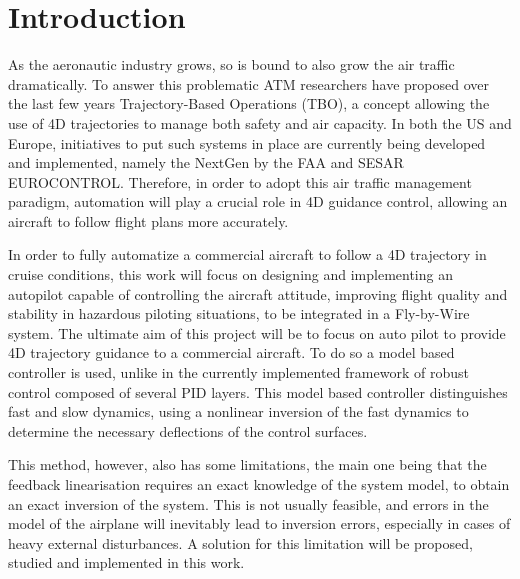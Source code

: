 
\section{Introduction}
\label{sec:intro}

As the aeronautic industry grows, so is bound to also grow the air traffic dramatically. To answer this problematic ATM researchers have proposed over the last few years Trajectory-Based Operations (TBO), a concept allowing the use of 4D trajectories to manage both safety and air capacity. In both the US and Europe, initiatives to put such systems in place are currently being developed and implemented, namely the NextGen by the FAA and SESAR EUROCONTROL. Therefore, in order to adopt this air traffic management paradigm, automation will play a crucial role in 4D guidance control, allowing an aircraft to follow flight plans more accurately.

In order to fully automatize a commercial aircraft to follow a 4D trajectory in cruise conditions, this work will focus on designing and implementing an autopilot capable of controlling the aircraft attitude, improving flight quality and stability in hazardous piloting situations, to be integrated in a Fly-by-Wire system. The ultimate aim of this project will be to focus on auto pilot to provide 4D trajectory guidance to a commercial aircraft. To do so a model based controller is used, unlike in the currently implemented framework of robust control composed of several PID layers. This model based controller distinguishes fast and slow dynamics, using a nonlinear inversion of the fast dynamics to determine the necessary deflections of the control surfaces. 

This method, however, also has some limitations, the main one being that the feedback linearisation requires an exact knowledge of the system model, to obtain an exact inversion of the system. This is not usually feasible, and errors in the model of the airplane will inevitably lead to inversion errors, especially in cases of heavy external disturbances. A solution for this limitation will be proposed, studied and implemented in this work. 

